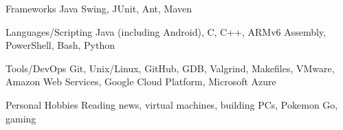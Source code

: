 

\begin{cvskills}

  \cvskill
    {Frameworks} %
    {Java Swing, JUnit, Ant, Maven} %

  \cvskill
    {Languages/Scripting} %
    {Java (including Android), C, C++, ARMv6 Assembly, PowerShell, Bash, Python} %
    
  \cvskill
    {Tools/DevOps} %
    {Git, Unix/Linux, GitHub, GDB, Valgrind, Makefiles, VMware, Amazon Web Services, Google Cloud Platform, Microsoft Azure} %

  \cvskill
  {Personal Hobbies} %
  {Reading news, virtual machines, building PCs, Pokemon Go, gaming} %

\end{cvskills}
